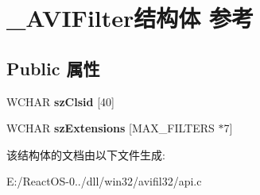 \hypertarget{struct___a_v_i_filter}{}\section{\+\_\+\+A\+V\+I\+Filter结构体 参考}
\label{struct___a_v_i_filter}
\subsection*{Public 属性}
\begin{DoxyCompactItemize}
\item 
\mbox{\label{struct___a_v_i_filter_a97926adc8766159d92d05530910f3826}} 
W\+C\+H\+AR {\bfseries sz\+Clsid} \mbox{[}40\mbox{]}
\item 
\mbox{\label{struct___a_v_i_filter_a6e7a77ddc61aa1a1646b9e315baa0ea6}} 
W\+C\+H\+AR {\bfseries sz\+Extensions} \mbox{[}M\+A\+X\+\_\+\+F\+I\+L\+T\+E\+RS $\ast$7\mbox{]}
\end{DoxyCompactItemize}


该结构体的文档由以下文件生成\+:\begin{DoxyCompactItemize}
\item 
E\+:/\+React\+O\+S-\/0../dll/win32/avifil32/api.\+c\end{DoxyCompactItemize}
